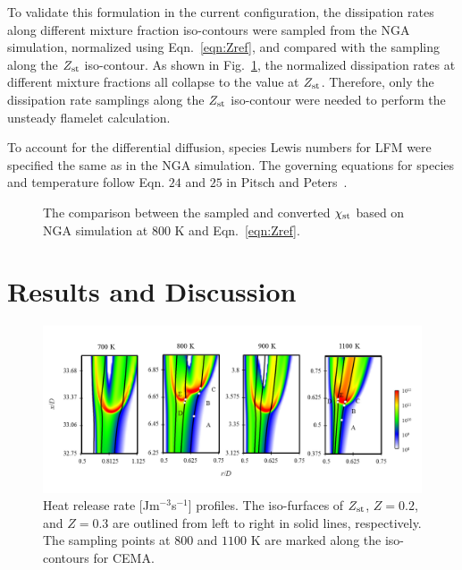 \documentclass[review,3p,times]{elsarticleUS}
\begin{document}
To validate this formulation in the current configuration, the dissipation rates along different mixture fraction iso-contours were sampled from the NGA simulation, normalized using Eqn.~\ref{eqn:Zref}, and compared with the sampling along the $Z_{\rm st}$ iso-contour.  As shown in Fig.~\ref{fig:Zref}, the normalized dissipation rates at different mixture fractions all collapse to the value at $Z_{\rm st}$.  Therefore, only the dissipation rate samplings along the $Z_{\rm st}$ iso-contour were needed to perform the unsteady flamelet calculation.

To account for the differential diffusion, species Lewis numbers for LFM  were specified the same as in the NGA simulation.  The governing equations for species and temperature follow Eqn. $24$ and $25$ in Pitsch and Peters~\cite{pitsch98b}.


\begin{figure}
  \centering
  \scriptsize
  
  \normalsize
  \caption{The comparison between the sampled and converted $\chi_{\rm st}$ based on NGA simulation at $800$ K and Eqn.~\ref{eqn:Zref}.}
  \label{fig:Zref}
\end{figure}

\section{Results and Discussion} 

\begin{figure}[t]
  \centering
  \scriptsize
  \vspace{-0.1in}
  \includegraphics[width=1.0\textwidth]{HRR.png}
  \normalsize
  \vspace{-0.1in}
  \caption{Heat release rate [Jm$^{-3}$s$^{-1}$] profiles.  The iso-furfaces of $Z_{\rm st}$, $Z = 0.2$, and $Z = 0.3$ are outlined from left to right in solid lines, respectively.  The sampling points at $800$ and $1100$ K are marked along the iso-contours for CEMA.}
  \label{fig:HRR}
\end{figure}
\end{document}
